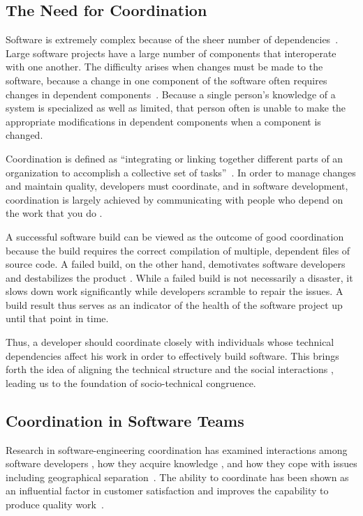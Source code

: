 \subsection{The Need for Coordination}

Software is extremely complex because of the sheer number of dependencies~\cite{sawyer2004:teams}.
Large software projects have a large number of components that interoperate with one another.
The difficulty arises when changes must be made to the software, because a change in one component of the software often requires changes in dependent components~\cite{desouza:2008}. Because a single person's knowledge of a system is specialized as well as limited, that person often is unable to make the appropriate modifications in dependent components when a component is changed.

Coordination is defined as ``integrating or linking together different parts of an organization to accomplish a collective set of tasks''~\cite{vandeven1976}. In order to manage changes and maintain quality, developers must coordinate, and in software development, coordination is largely achieved by communicating with people who depend on the work that you do \cite{kraut:1995coordination}.

A successful software build can be viewed as the outcome of good coordination because the build requires the correct compilation of multiple, dependent files of source code.
A failed build, on the other hand, demotivates software developers \cite{holck2004,damian:icgse:2007} and destabilizes the product \cite{cusumano1997}.
While a failed build is not necessarily a disaster, it slows down work significantly while developers scramble to repair the issues.
A build result thus serves as an indicator of the health of the software project up until that point in time.

Thus, a developer should coordinate closely with individuals whose technical dependencies affect his work in order to effectively build software. This brings forth the idea of aligning the technical structure and the social interactions \cite{herbsleb2007:fose}, leading us to the foundation of socio-technical congruence.

\subsection{Coordination in Software Teams}
Research in software-engineering coordination has examined interactions among
software developers \cite{carter2004,marczak:re:2008}, how they acquire
knowledge \cite{ehrlich:icgse:2006,nakakoji2010:rdc}, and
how they cope with issues including geographical
separation~\cite{espinosa2007:team_knowledge,herbsleb2003:speed}.
The ability to coordinate has
been shown as an influential factor in customer satisfaction \cite{kraut:1995coordination} and  improves the capability to produce quality work~\cite{faraj2000}.


